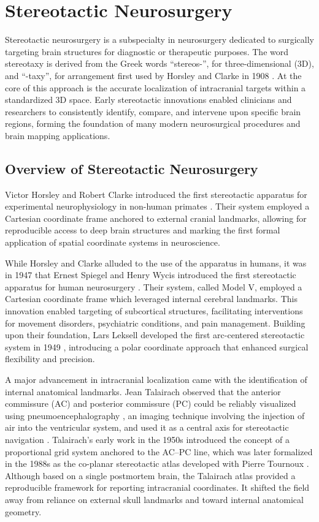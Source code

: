 \section{Stereotactic Neurosurgery}
Stereotactic neurosurgery is a subspecialty in neurosurgery dedicated to surgically targeting brain structures for diagnostic or therapeutic purposes. The word stereotaxy is derived from the Greek words “stereos-”, for three-dimensional (3D), and “-taxy”, for arrangement first used by Horsley and Clarke in 1908 \cite{Horsley1908-om}. At the core of this approach is the accurate localization of intracranial targets within a standardized 3D space. Early stereotactic innovations enabled clinicians and researchers to consistently identify, compare, and intervene upon specific brain regions, forming the foundation of many modern neurosurgical procedures and brain mapping applications.

\subsection{Overview of Stereotactic Neurosurgery}
Victor Horsley and Robert Clarke introduced the first stereotactic apparatus for experimental neurophysiology in non-human primates \cite{Horsley1908-om}. Their system employed a Cartesian coordinate frame anchored to external cranial landmarks, allowing for reproducible access to deep brain structures and marking the first formal application of spatial coordinate systems in neuroscience.

While Horsley and Clarke alluded to the use of the apparatus in humans, it was in 1947 that Ernest Spiegel and Henry Wycis introduced the first stereotactic apparatus for human neurosurgery \cite{Spiegel1947-rq}. Their system, called Model V, employed a Cartesian coordinate frame which leveraged internal cerebral landmarks. This innovation enabled targeting of subcortical structures, facilitating interventions for movement disorders, psychiatric conditions, and pain management. Building upon their foundation, Lars Leksell developed the first arc-centered stereotactic system in 1949 \cite{Leksell1949-wl}, introducing a polar coordinate approach that enhanced surgical flexibility and precision.

A major advancement in intracranial localization came with the identification of internal anatomical landmarks. Jean Talairach observed that the anterior commissure (AC) and posterior commissure (PC) could be reliably visualized using pneumoencephalography \cite{Dandy1918-os}, an imaging technique involving the injection of air into the ventricular system, and used it as a central axis for stereotactic navigation \cite{Talalrach1957-bs}. Talairach’s early work in the 1950s introduced the concept of a proportional grid system anchored to the AC–PC line, which was later formalized in the 1988s as the co-planar stereotactic atlas developed with Pierre Tournoux \cite{Talairach1988-wk}. Although based on a single postmortem brain, the Talairach atlas provided a reproducible framework for reporting intracranial coordinates. It shifted the field away from reliance on external skull landmarks and toward internal anatomical geometry.

